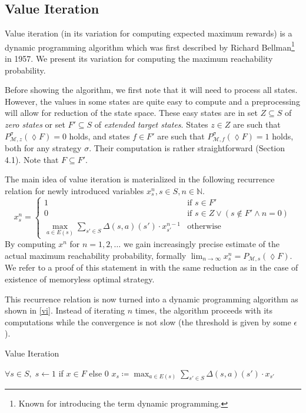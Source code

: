 \subsection*{Value Iteration}

Value iteration (in its variation for computing expected maximum rewards) is a
dynamic programming algorithm which was first described by Richard
Bellman\footnote{Known for introducing the term dynamic programming.}
\parencite{bellman} in 1957. We present its variation for computing the maximum
reachability probability.

Before showing the algorithm, we first note that it will need to
process all states. However, the values in some states are quite easy to
compute and a preprocessing will allow for reduction of the
state space.
These easy states are in set $Z \subseteq S$
of {\em zero states} or set $F' \subseteq S$ of {\em extended target states}.
States $z \in Z$ are such that $P^\sigma_{\mathcal{M},z}(\lozenge F) = 0$ holds,
and states $f \in F'$ are such that $P^\sigma_{\mathcal{M},f}(\lozenge F) = 1$
holds, both for any strategy $\sigma$.
Their computation is rather straightforward \parencite{forejt} (Section
4.1). Note that $F \subseteq F'$.

The main idea of value iteration is materialized in the following
recurrence relation for newly introduced variables $x_s^n, s \in S, n
\in \mathbb{N}$.
\[
x_s^n =
\begin{cases}
    1 & \text{if }s \in F' \\
    0 & \text{if }s \in Z \lor (s \not \in F' \land n = 0) \\
    \max\limits_{a \in E(s)} \sum\limits_{s' \in S} \Delta(s,a)(s') \cdot x_{s'}^{n-1}
    & \text{otherwise} %
\end{cases}
\]
By computing $x^n$ for $n = 1,2,\ldots$ we gain increasingly precise
estimate of the actual maximum reachability probability,
formally $\lim_{n \to \infty} x^n_s = P_{\mathcal{M},s}(\lozenge F)$.
We refer to a proof of this statement in \parencite{puterman} with the
same reduction as in the case of existence of memoryless optimal
strategy.

This recurrence relation is now turned into a dynamic programming
algorithm as shown in \autoref{vi}. Instead of iterating $n$ times, the
algorithm proceeds with its computations while the convergence is not
slow (the threshold is given by some $\epsilon$).

\begin{algorithm}
\caption{Value Iteration}
\label{vi}
\begin{algorithmic}[1]
    \State $\forall s \in S,\; s \gets 1$ if $x \in F$ else $0$
    \Do
            \State $x_s \coloneqq
            \max_{a \in E(s)} \sum_{s' \in S} \Delta(s,a)(s') \cdot x_{s'}$
        \EndFor
\end{algorithmic}
\end{algorithm}

